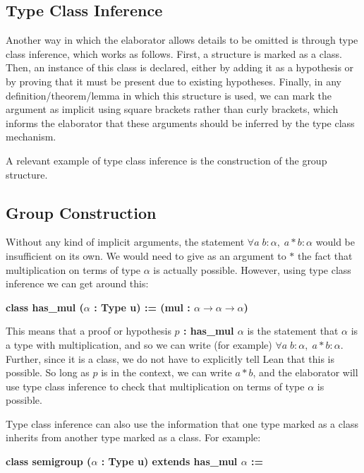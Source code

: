 \documentclass[runningheads,a4paper]{llncs}
\renewcommand{\a}{\alpha}
\renewcommand{\-}{\setminus}
\begin{document}
\subsection{Type Class Inference}

Another way in which the elaborator allows details to be omitted is through type class inference, which works as follows. First, a structure is marked as a class. Then, an instance of this class is declared, either by adding it as a hypothesis or by proving that it must be present due to existing hypotheses. Finally, in any definition/theorem/lemma in which this structure is used, we can mark the argument as implicit using square brackets rather than curly brackets, which informs the elaborator that these arguments should be inferred by the type class mechanism.

A relevant example of type class inference is the construction of the group structure.

\subsection{Group Construction}

Without any kind of implicit arguments, the statement $\forall a\; b : \a,\; a*b : \a$ would be insufficient on its own. We would need to give as an argument to $*$ the fact that multiplication on terms of type $\a$ is actually possible. However, using type class inference we can get around this:

\vspace{2 mm}
\hspace{4 em}\textbf{class has\_mul ($\a$ : Type u) := (mul : $\a \to \a \to \a$)}
\vspace{2 mm}

This means that a proof or hypothesis \textbf{$p$ : has\_mul $\a$} is the statement that $\a$ is a type with multiplication, and so we can write (for example) $\forall a\; b : \a,\; a*b : \a$. Further, since it is a class, we do not have to explicitly tell Lean that this is possible. So long as $p$ is in the context, we can write $a * b$, and the elaborator will use type class inference to check that multiplication on terms of type $\a$ is possible.

Type class inference can also use the information that one type marked as a class inherits from another type marked as a class. For example:

\vspace{2 mm}
\hspace{4 em}\textbf{class semigroup ($\a$ : Type u) extends has\_mul $\a$
 := }
\end{document}
